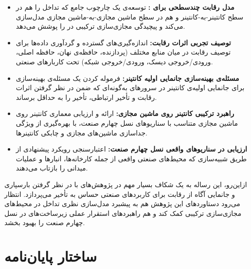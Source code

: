 \begin{itemize}
\item
\textbf{مدل رقابت چندسطحی برای :}
توسعه‌ی یک چارچوب جامع که تداخل را هم در سطح کانتینر-به-کانتینر و هم در سطح ماشین مجازی-به-ماشین مجازی مدل‌سازی می‌کند و پیچیدگی مجازی‌سازی ترکیبی در  را پوشش می‌دهد.

\item
\textbf{توصیف تجربی اثرات رقابت:}
اندازه‌گیری‌های گسترده و گردآوری داده‌ها برای توصیف رقابت در میان منابع مختلف (پردازنده، حافظه‌ی نهان، حافظه اصلی، ورودی/خروجی دیسک، ورودی/خروجی شبکه) تحت کاربارهای صنعتی.

\item
\textbf{مسئله‌ی بهینه‌سازی جانمایی اولیه کانتینر:}
فرموله‌ کردن یک مسئله‌ی بهینه‌سازی برای جانمایی اولیه‌ی کانتینر در سرورهای  به‌گونه‌ای که ضمن در نظر گرفتن اثرات رقابت و تأخیر ارتباطی، تأخیر را به حداقل برساند.

\item
\textbf{راهبرد ترکیبی کانتینر روی ماشین مجازی:}
ارائه و ارزیابی معماری کانتینر روی ماشین مجازی متناسب با سناریوهای نسل چهارم صنعت، با بهره‌گیری از ویژگی جداسازی ماشین‌های مجازی و چابکی کانتینرها.

\item
\textbf{ارزیابی در سناریوهای واقعی نسل چهارم صنعت:}
اعتبارسنجی رویکرد پیشنهادی از طریق شبیه‌سازی‌ که محیط‌های صنعتی واقعی از جمله کارخانه‌ها، انبارها و عملیات میدانی را بازتاب می‌دهند.

\end{itemize}

ازاین‌رو، این رساله به یک شکاف بسیار مهم در پژوهش‌های  با در نظر گرفتن بارسپاری و جانمایی آگاه از رقابت برای کاربردهای صنعتی حساس به تأخیر می‌پردازد. انتظار می‌رود دستاوردهای این پژوهش هم به پیشبرد مدل‌سازی نظری تداخل در محیط‌های مجازی‌سازی ترکیبی کمک کند و هم راهبردهای استقرار عملی زیرساخت‌های  در نسل چهارم صنعت را بهبود بخشد.

\section{ساختار پایان‌نامه}

